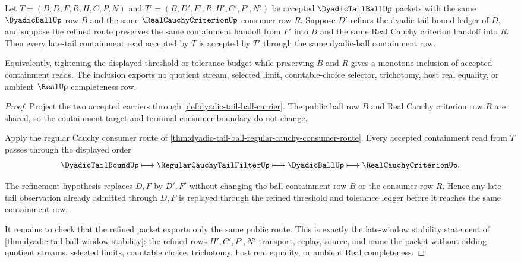 \begin{theorem}
\label{thm:dyadic-tail-ball-monotone-inclusion}
Let $T=(B,D,F,R,H,C,P,N)$ and $T'=(B,D',F',R,H',C',P',N')$ be accepted $\DyadicTailBallUp$ packets with the same $\DyadicBallUp$ row $B$ and the same $\RealCauchyCriterionUp$ consumer row $R$. Suppose $D'$ refines the dyadic tail-bound ledger of $D$, and suppose the refined route preserves the same containment handoff from $F'$ into $B$ and the same Real Cauchy criterion handoff into $R$. Then every late-tail containment read accepted by $T$ is accepted by $T'$ through the same dyadic-ball containment row.

Equivalently, tightening the displayed threshold or tolerance budget while preserving $B$ and $R$ gives a monotone inclusion of accepted containment reads. The inclusion exports no quotient stream, selected limit, countable-choice selector, trichotomy, host real equality, or ambient $\RealUp$ completeness row.
\end{theorem}
\begin{proof}
Project the two accepted carriers through \autoref{def:dyadic-tail-ball-carrier}. The public ball row $B$ and Real Cauchy criterion row $R$ are shared, so the containment target and terminal consumer boundary do not change.

Apply the regular Cauchy consumer route of \autoref{thm:dyadic-tail-ball-regular-cauchy-consumer-route}. Every accepted containment read from $T$ passes through the displayed order
$$
\DyadicTailBoundUp \longmapsto \RegularCauchyTailFilterUp \longmapsto \DyadicBallUp \longmapsto \RealCauchyCriterionUp .
$$

The refinement hypothesis replaces $D,F$ by $D',F'$ without changing the ball containment row $B$ or the consumer row $R$. Hence any late-tail observation already admitted through $D,F$ is replayed through the refined threshold and tolerance ledger before it reaches the same containment row.

It remains to check that the refined packet exports only the same public route. This is exactly the late-window stability statement of \autoref{thm:dyadic-tail-ball-window-stability}: the refined rows $H',C',P',N'$ transport, replay, source, and name the packet without adding quotient streams, selected limits, countable choice, trichotomy, host real equality, or ambient Real completeness.
\end{proof}

